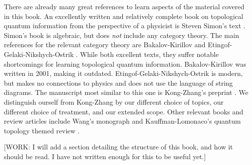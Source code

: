There are already many great references to learn aspects of the material covered in this book. An excellently written and relatively complete book on topological quantum information from the perspective of a physicist is Steven Simon's text \cite{simon2023topological}. Simon's book is algebraic, but does \textit{not} include any category theory. The main references for the relevant category theory are Bakalov-Kirillov \cite{bakalov2001lectures} and Etingof-Gelaki-Nikshych-Ostrik \cite{etingof2016tensor}. While both excellent texts, they suffer notable shortcomings for learning topological quantum information. Bakalov-Kirillov was written in 2001, making it outdated. Etingof-Gelaki-Nikshych-Ostrik is modern, but makes no connections to physics and does not use the language of string diagrams. The manuscript most similar to this one is Kong-Zhang's preprint \cite{kong2022invitation}. We distinguish ourself from Kong-Zhang by our different choice of topics, our different choice of treatment, and our extended scope. Other relevant books and review articles include Wang's monograph \cite{wang2010topological} and Kauffman-Lomonaco's quantum topology themed review \cite{kauffman2009topological}.

[WORK: I will add a section detailing the structure of this book, and how it should be read. I have not written enough for this to be useful yet.]